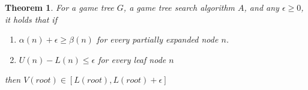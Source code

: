 \documentclass[letterpaper]{article} %
\newtheorem{theorem}{Theorem}
\newcommand{\MM}{\mathit{V}}
\newcommand{\pess}{\mathit{L}}
\newcommand{\opti}{\mathit{U}}
\newcommand{\rootnode}{\mathit{root}}
\begin{document}
\begin{theorem}
For a game tree $G$, a game tree search algorithm $A$, 
and any $\epsilon\geq 0$, it holds that if 
\begin{enumerate}
\item $\alpha(n)+\epsilon\geq \beta(n)$ for every partially expanded node $n$. 
\item $\opti(n)-\pess(n)\leq \epsilon$ for every leaf node $n$ 
\end{enumerate}
then $\MM(\rootnode)\in [\pess(\rootnode),\pess(\rootnode)+\epsilon]$
\label{the:basic}
\end{theorem}
\end{document}
